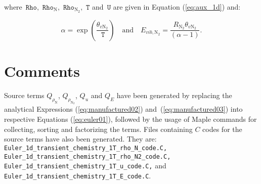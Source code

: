 \documentclass[10pt]{article}
\newcommand{\Rho}{\,\mathtt{Rho}}
\newcommand{\T}{\,\mathtt{T}}
\newcommand{\U}{\,\mathtt{U}}
\begin{document}
where $\Rho,\,\Rho_{\text{N}},\,\Rho_{\text{N}_2},\, \T$ and $\U$ are given  in Equation (\ref{eq:aux_1d}) and:

$$\alpha = \exp\left(\dfrac{\theta_{v \text{N}_2}}{\T}\right)\quad \mbox{and} \quad  E_{vib, \text{N}_2} = \dfrac{R_{\text{N}_2} \theta_{v \text{N}_2}}{(\alpha-1)}.$$







\section{Comments}


Source terms $Q_{\rho_\text{N} }$, $Q_{\rho_{\text{N}_{2}}}$, $Q_u$ and $Q_E$ have been generated by replacing the analytical Expressions (\ref{eq:manufactured02}) and~(\ref{eq:manufactured03}) into respective Equations (\ref{eq:euler01}), followed by the usage of Maple commands for collecting, sorting and factorizing the terms. Files containing $C$ codes for the source terms have also been generated. They are: \texttt{ Euler\_1d\_transient\_chemistry\_1T\_rho\_N\_code.C, Euler\_1d\_transient\_chemistry\_1T\_rho\_N2\_code.C,\\ Euler\_1d\_transient\_chemistry\_1T\_u\_code.C,} and \texttt{Euler\_1d\_transient\_chemistry\_1T\_E\_code.C}.
\end{document}
